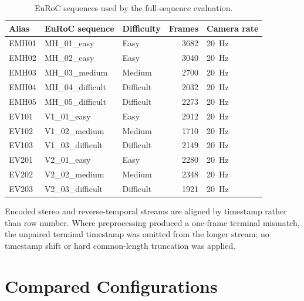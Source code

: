 \begin{table}[htbp]
  \centering
  \caption[EuRoC evaluation sequences]{EuRoC sequences used by the full-sequence evaluation.}
  \label{tab:euroc-evaluation-set}
  \begin{tabular}{@{}lllrl@{}}
    \toprule
    Alias & EuRoC sequence & Difficulty & Frames & Camera rate \\
    \midrule
    EMH01 & MH\_01\_easy      & Easy      & 3682 & \SI{20}{\hertz} \\
    EMH02 & MH\_02\_easy      & Easy      & 3040 & \SI{20}{\hertz} \\
    EMH03 & MH\_03\_medium    & Medium    & 2700 & \SI{20}{\hertz} \\
    EMH04 & MH\_04\_difficult & Difficult & 2032 & \SI{20}{\hertz} \\
    EMH05 & MH\_05\_difficult & Difficult & 2273 & \SI{20}{\hertz} \\
    EV101 & V1\_01\_easy      & Easy      & 2912 & \SI{20}{\hertz} \\
    EV102 & V1\_02\_medium    & Medium    & 1710 & \SI{20}{\hertz} \\
    EV103 & V1\_03\_difficult & Difficult & 2149 & \SI{20}{\hertz} \\
    EV201 & V2\_01\_easy      & Easy      & 2280 & \SI{20}{\hertz} \\
    EV202 & V2\_02\_medium    & Medium    & 2348 & \SI{20}{\hertz} \\
    EV203 & V2\_03\_difficult & Difficult & 1921 & \SI{20}{\hertz} \\
    \bottomrule
  \end{tabular}
\end{table}

Encoded stereo and reverse-temporal streams are aligned by timestamp rather than
row number. Where preprocessing produced a one-frame terminal mismatch, the
unpaired terminal timestamp was omitted from the longer stream; no timestamp
shift or hard common-length truncation was applied.

\section{Compared Configurations}

